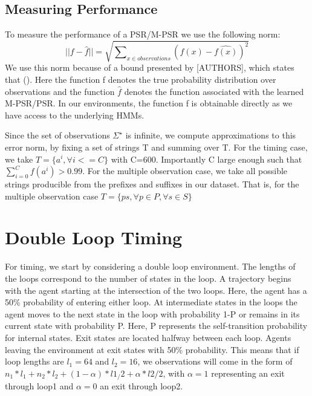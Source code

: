 
\subsection{Measuring Performance}

To measure the performance of a PSR/M-PSR we use the following norm:
\begin{equation*}
||f - \hat{f}|| = \sqrt{\sum\nolimits_{x \in observations}(f(x) - \hat{f(x)})^2}
\end{equation*}
We use this norm because of a bound presented by [AUTHORS], which states that (). Here the function f denotes the true probability distribution over observations and the function $\hat{f}$ denotes the function associated with the learned M-PSR/PSR. In our environments, the function f is obtainable directly as we have access to the underlying HMMs.

Since the set of observations $\Sigma^{\star}$ is infinite, we compute approximations to this error norm, by fixing a set of strings T and summing over T. For the timing case, we take $T = \{a^i, \forall i<=C\}$ with C=600. Importantly C large enough such that $\sum_{i=0}^{C}f(a^i)>0.99$. For the multiple observation case, we take all possible strings producible from the prefixes and suffixes in our dataset. That is, for the multiple observation case $T = \{ps, \forall p \in P, \forall s \in S\} $


\section{Double Loop Timing}

For timing, we start by considering a double loop environment. The lengths of the loops correspond to the number of states in the loop. A trajectory begins with the agent starting at the intersection of the two loops. Here, the agent has a 50\% probability of entering either loop. At intermediate states in the loops the agent moves to the next state in the loop with probability 1-P or remains in its current state with probability P. Here, P represents the self-transition probability for internal states. Exit states are located halfway between each loop. Agents leaving the environment at exit states with 50\% probability. This means that if loop lengths are $l_1=64$ and $l_2=16$, we observations will come in the form of $n_1*l_1+n_2*l_2+(1-\alpha)*l1_/2 + \alpha*l2/2$, with $\alpha=1$ representing an exit through loop1 and $\alpha=0$ an exit through loop2.

